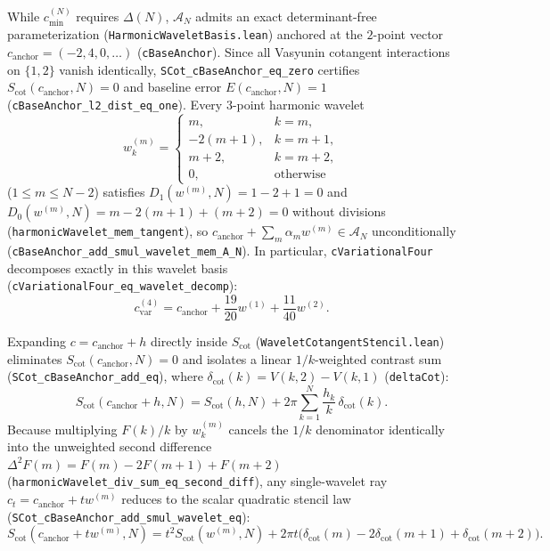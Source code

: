 \documentclass[11pt,a4paper]{article}
\theoremstyle{definition}
\begin{document}
While $c_{\min}^{(N)}$ requires $\Delta(N)$, $\mathcal{A}_N$ admits an exact determinant-free parameterization (\texttt{HarmonicWaveletBasis.lean}) anchored at the $2$-point vector $c_{\mathrm{anchor}} = (-2, 4, 0, \dots)$ (\texttt{cBaseAnchor}). Since all Vasyunin cotangent interactions on $\{1, 2\}$ vanish identically, \texttt{SCot\_\allowbreak cBaseAnchor\_\allowbreak eq\_\allowbreak zero} certifies $S_{\mathrm{cot}}(c_{\mathrm{anchor}}, N) = 0$ and baseline error $E(c_{\mathrm{anchor}}, N) = 1$ (\texttt{cBaseAnchor\_\allowbreak l2\_\allowbreak dist\_\allowbreak eq\_\allowbreak one}). Every $3$-point harmonic wavelet
\begin{equation}
w_k^{(m)} = \begin{cases}
m, & k = m, \\
-2(m + 1), & k = m + 1, \\
m + 2, & k = m + 2, \\
0, & \text{otherwise}
\end{cases}
\end{equation}
($1 \le m \le N - 2$) satisfies $D_1(w^{(m)}, N) = 1 - 2 + 1 = 0$ and $D_0(w^{(m)}, N) = m - 2(m+1) + (m+2) = 0$ without divisions (\texttt{harmonicWavelet\_\allowbreak mem\_\allowbreak tangent}), so $c_{\mathrm{anchor}} + \sum_m \alpha_m w^{(m)} \in \mathcal{A}_N$ unconditionally (\texttt{cBaseAnchor\_\allowbreak add\_\allowbreak smul\_\allowbreak wavelet\_\allowbreak mem\_\allowbreak A\_\allowbreak N}). In particular, \texttt{cVariationalFour} decomposes exactly in this wavelet basis (\texttt{cVariationalFour\_\allowbreak eq\_\allowbreak wavelet\_\allowbreak decomp}):
\begin{equation}
c_{\mathrm{var}}^{(4)} = c_{\mathrm{anchor}} + \frac{19}{20} w^{(1)} + \frac{11}{40} w^{(2)}.
\end{equation}

Expanding $c = c_{\mathrm{anchor}} + h$ directly inside $S_{\mathrm{cot}}$ (\texttt{Wavelet\allowbreak Cotangent\allowbreak Stencil.lean}) eliminates $S_{\mathrm{cot}}(c_{\mathrm{anchor}}, N) = 0$ and isolates a linear $1/k$-weighted contrast sum (\texttt{SCot\_\allowbreak cBaseAnchor\_\allowbreak add\_\allowbreak eq}), where $\delta_{\mathrm{cot}}(k) = V(k, 2) - V(k, 1)$ (\texttt{deltaCot}):
\begin{equation}
S_{\mathrm{cot}}(c_{\mathrm{anchor}} + h, N) = S_{\mathrm{cot}}(h, N) + 2\pi \sum_{k=1}^N \frac{h_k}{k}\,\delta_{\mathrm{cot}}(k).
\end{equation}
Because multiplying $F(k)/k$ by $w_k^{(m)}$ cancels the $1/k$ denominator identically into the unweighted second difference $\Delta^2 F(m) = F(m) - 2F(m+1) + F(m+2)$ (\texttt{harmonicWavelet\_\allowbreak div\_\allowbreak sum\_\allowbreak eq\_\allowbreak second\_\allowbreak diff}), any single-wavelet ray $c_t = c_{\mathrm{anchor}} + t w^{(m)}$ reduces to the scalar quadratic stencil law (\texttt{SCot\_\allowbreak cBaseAnchor\_\allowbreak add\_\allowbreak smul\_\allowbreak wavelet\_\allowbreak eq}):
\begin{equation}
S_{\mathrm{cot}}(c_{\mathrm{anchor}} + t w^{(m)}, N) = t^2 S_{\mathrm{cot}}(w^{(m)}, N) + 2\pi t \big(\delta_{\mathrm{cot}}(m) - 2\delta_{\mathrm{cot}}(m+1) + \delta_{\mathrm{cot}}(m+2)\big).
\end{equation}
\end{document}
